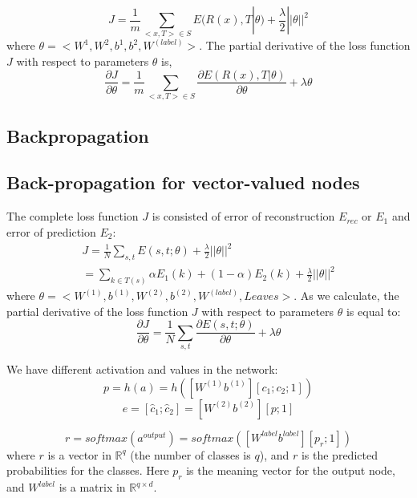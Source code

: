 \documentclass[twoside,12pt]{article}
\begin{document}
\begin{equation}
J=\frac{1}{m}\sum_{<x,T> \in S}E(R(x),T|\theta)+\frac{\lambda}{2}||\theta||^2
\end{equation}
where $\theta=<W^1,W^2,b^1,b^2,W^{(label)}>$. The partial derivative of the loss function $J$ with respect to parameters $\theta$ is,
\begin{equation}
\frac{\partial J}{\partial \theta}=\frac{1}{m} \sum_{<x,T> \in S}\frac{\partial E(R(x),T|\theta)}{\partial \theta}+\lambda \theta
\end{equation}

\subsection{Backpropagation}\subsection{Back-propagation for vector-valued nodes}
The complete loss function $J$ is consisted of error of reconstruction $E_{rec}$ or $E_1$ and error of prediction $E_2$:
\begin{align}
J=\frac{1}{N}\sum_{s,t}E(s,t;\theta)+\frac{\lambda}{2}||\theta||^2\\
=\sum_{k \in T(s)}\alpha E_1(k)+(1-\alpha)E_2(k)+\frac{\lambda}{2}||\theta||^2
\end{align}
where $\theta=<W^{(1)},b^{(1)},W^{(2)},b^{(2)},W^{(label)},Leaves>$. As we calculate, the partial derivative of the loss function $J$ with respect to parameters $\theta$ is equal to:
\begin{equation}
\frac{\partial J}{\partial \theta}=\frac{1}{N}\sum_{s,t}\frac{\partial E(s,t;\theta)}{\partial \theta}+\lambda \theta
\end{equation}

We have different activation and values in the network:
\begin{equation}
p=h(a)=h([W^{(1)} b^{(1)}][c_1;c_2;1])
\end{equation}
\begin{equation}
e=[\hat{c}_1;\hat{c}_2]=[W^{(2)} b^{(2)}][p;1]
\end{equation}

\begin{equation}
r = softmax(a^{output})=softmax([W^{label} b^{label}][p_r;1])
\end{equation}
where $r$ is a vector in $\mathbb{R}^q$ (the number of classes is $q$), and $r$ is the predicted probabilities for the classes. Here $p_r$ is the meaning vector for the output node, and $W^{label}$ is a matrix in $\mathbb{R}^{q\times d}$.
\end{document}
